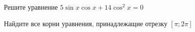 \begin{ex}
	\begin{condition}
		\begin{enumcols}[label=\asbuk*)]
			\item Решите уравнение \( 5\sin x\cos x + 14\cos^2 x =0 \)
			\item Найдите все корни уравнения, принадлежащие отрезку \( \left[\pi;2\pi\right] \)
		\end{enumcols}
	\end{condition}
\end{ex}